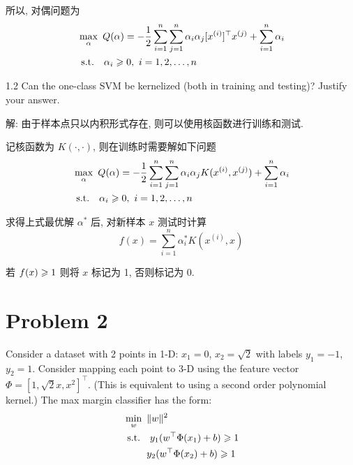 \documentclass{article}
\begin{document}
所以, 对偶问题为
\begin{equation}
  \begin{aligned}
    &\max_\alpha~Q(\alpha)=-\frac{1}{2}\sum_{i=1}^n\sum_{j=1}^n\alpha_i\alpha_j[x^{(i)}]^{\top}x^{(j)}+\sum_{i=1}^n\alpha_i\\
    &~\mathrm{s.t.}\quad\alpha_i\geqslant0,~i=1,2,\dots,n
  \end{aligned}
\end{equation}

1.2 Can the one-class SVM be kernelized (both in training and testing)? Justify your answer.

解: 由于样本点只以内积形式存在, 则可以使用核函数进行训练和测试.

记核函数为 $K(\cdot,\cdot)$, 则在训练时需要解如下问题
\begin{equation}
  \begin{aligned}
    &\max_\alpha~Q(\alpha)=-\frac{1}{2}\sum_{i=1}^n\sum_{j=1}^n\alpha_i\alpha_jK(x^{(i)},x^{(j)})+\sum_{i=1}^n\alpha_i\\
    &~\mathrm{s.t.}\quad\alpha_i\geqslant0,~i=1,2,\dots,n
  \end{aligned}
\end{equation}

求得上式最优解 $\alpha^*$ 后, 对新样本 $x$ 测试时计算
\begin{equation}
  f(x)=\sum_{i=1}^n\alpha^*_iK(x^{(i)},x)
\end{equation}

若 $f(x)\geqslant1$ 则将 $x$ 标记为 1, 否则标记为 0.

\section*{Problem 2}

Consider a dataset with 2 points in 1-D: $x_1 = 0$, $x_2 = \sqrt{2}$ with labels $ y_1 = -1$, $y_2 = 1$. Consider mapping each point to 3-D using the feature vector $\Phi = [1, \sqrt{2}x, x^2]^{\top}$. (This is equivalent to using a second order polynomial kernel.) The max margin classifier has the form:
\begin{equation}
  \begin{aligned}
    &\min_w~\|w\|^2   \\
    &~\mathrm{s.t.}~~~y_1(w^{\top} \Phi(x_1)+b)\geqslant1 \\
    &\quad\quad~y_2(w^{\top}\Phi(x_2)+b)\geqslant1 \\
  \end{aligned}
\end{equation}
\end{document}
